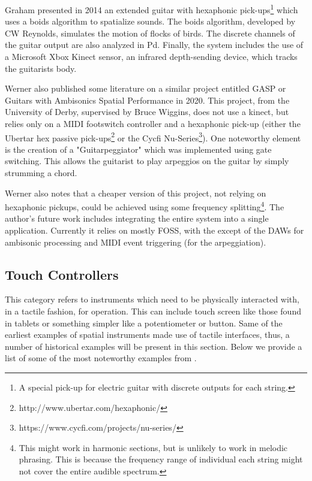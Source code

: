 Graham \cite{graham2014gesture} presented in 2014 an extended guitar with hexaphonic pick-ups\footnote{A special pick-up for electric guitar with discrete outputs for each string.} which uses a boids algorithm to spatialize sounds. The boids algorithm, developed by CW Reynolds, simulates the motion of flocks of birds. The discrete channels of the guitar output are also analyzed in Pd. Finally, the system includes the use of a Microsoft Xbox Kinect sensor, an infrared depth-sending device, which tracks the guitarists body.

Werner \cite{wernerdevelopment} also published some literature on a similar project entitled GASP or Guitars with Ambisonics Spatial Performance in 2020. This project, from the University of Derby, supervised by Bruce Wiggins, does not use a kinect, but relies only on a MIDI footswitch controller and a hexaphonic pick-up (either the Ubertar hex passive pick-ups\footnote{http://www.ubertar.com/hexaphonic/} or the Cycfi Nu-Series\footnote{https://www.cycfi.com/projects/nu-series/}). One noteworthy element is the creation of a "Guitarpeggiator" which was implemented using gate switching. This allows the guitarist to play arpeggios on the guitar by simply strumming a chord. 

Werner also notes that a cheaper version of this project, not relying on hexaphonic pickups, could be achieved using some frequency splitting\footnote{This might work in harmonic sections, but is unlikely to work in melodic phrasing. This is because the frequency range of individual each string might not cover the entire audible spectrum.}. The author's future work includes integrating the entire system into a single application. Currently it relies on mostly FOSS, with the except of the DAWs for ambisonic processing and MIDI event triggering (for the arpeggiation). 

\subsection{Touch Controllers} %

This category refers to instruments which need to be physically interacted with, in a tactile fashion, for operation. This can include touch screen like those found in tablets or something simpler like a potentiometer or button. Same of the earliest examples of spatial instruments made use of tactile interfaces, thus, a number of historical examples will be present in this section. Below we provide a list of some of the most noteworthy examples from \cite{pysiewicz2017instruments}.

